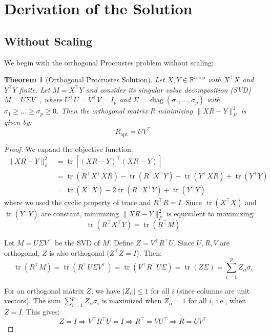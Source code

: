 \documentclass[11pt]{article}
\newtheorem{theorem}{Theorem}
\begin{document}
\section{Derivation of the Solution}
\label{sec:derivation}

\subsection{Without Scaling}
\label{subsec:without-scaling}

We begin with the orthogonal Procrustes problem without scaling:

\begin{theorem}[Orthogonal Procrustes Solution]
Let $X, Y \in \mathbb{R}^{n \times p}$ with $X^\top X$ and $Y^\top Y$ finite. Let $M = X^\top Y$ and consider its singular value decomposition (SVD) $M = U\Sigma V^\top$, where $U^\top U = V^\top V = I_p$ and $\Sigma = \operatorname{diag}(\sigma_1, \dots, \sigma_p)$ with $\sigma_1 \geq \dots \geq \sigma_p \geq 0$. Then the orthogonal matrix $R$ minimizing $\|XR - Y\|_F^2$ is given by:
\[
R_{\text{opt}} = U V^\top
\]
\end{theorem}

\begin{proof}
We expand the objective function:
\begin{align*}
\|XR - Y\|_F^2 &= \operatorname{tr}\left[(XR - Y)^\top (XR - Y)\right] \\
&= \operatorname{tr}(R^\top X^\top X R) - \operatorname{tr}(R^\top X^\top Y) - \operatorname{tr}(Y^\top X R) + \operatorname{tr}(Y^\top Y) \\
&= \operatorname{tr}(X^\top X) - 2\operatorname{tr}(R^\top X^\top Y) + \operatorname{tr}(Y^\top Y)
\end{align*}
where we used the cyclic property of trace and $R^\top R = I$. Since $\operatorname{tr}(X^\top X)$ and $\operatorname{tr}(Y^\top Y)$ are constant, minimizing $\|XR - Y\|_F^2$ is equivalent to maximizing:
\[
\operatorname{tr}(R^\top X^\top Y) = \operatorname{tr}(R^\top M)
\]

Let $M = U\Sigma V^\top$ be the SVD of $M$. Define $Z = V^\top R^\top U$. Since $U, R, V$ are orthogonal, $Z$ is also orthogonal ($Z^\top Z = I$). Then:
\[
\operatorname{tr}(R^\top M) = \operatorname{tr}(R^\top U\Sigma V^\top) = \operatorname{tr}(V^\top R^\top U \Sigma) = \operatorname{tr}(Z\Sigma) = \sum_{i=1}^p Z_{ii} \sigma_i
\]

For an orthogonal matrix $Z$, we have $|Z_{ii}| \leq 1$ for all $i$ (since columns are unit vectors). The sum $\sum_{i=1}^p Z_{ii} \sigma_i$ is maximized when $Z_{ii} = 1$ for all $i$, i.e., when $Z = I$. This gives:
\[
Z = I \Rightarrow V^\top R^\top U = I \Rightarrow R^\top = V U^\top \Rightarrow R = U V^\top
\]
\end{proof}
\end{document}
